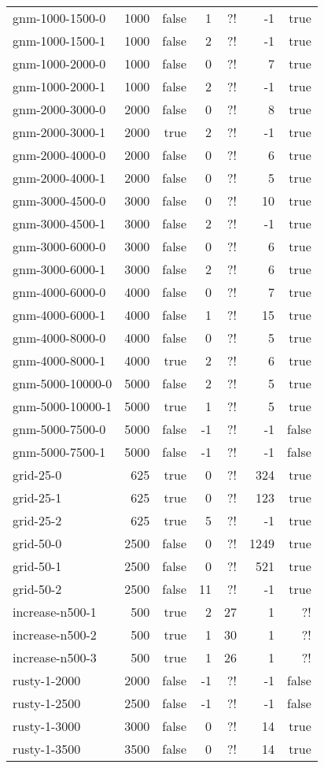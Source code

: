\documentclass{tufte-handout}
\begin{document}
\begin{longtable}{lrrrrrr}
gnm-1000-1500-0&1000&false&1&?!&-1&true\\ 
gnm-1000-1500-1&1000&false&2&?!&-1&true\\ 
gnm-1000-2000-0&1000&false&0&?!&7&true\\ 
gnm-1000-2000-1&1000&false&2&?!&-1&true\\ 
gnm-2000-3000-0&2000&false&0&?!&8&true\\ 
gnm-2000-3000-1&2000&true&2&?!&-1&true\\ 
gnm-2000-4000-0&2000&false&0&?!&6&true\\ 
gnm-2000-4000-1&2000&false&0&?!&5&true\\ 
gnm-3000-4500-0&3000&false&0&?!&10&true\\ 
gnm-3000-4500-1&3000&false&2&?!&-1&true\\ 
gnm-3000-6000-0&3000&false&0&?!&6&true\\ 
gnm-3000-6000-1&3000&false&2&?!&6&true\\ 
gnm-4000-6000-0&4000&false&0&?!&7&true\\ 
gnm-4000-6000-1&4000&false&1&?!&15&true\\ 
gnm-4000-8000-0&4000&false&0&?!&5&true\\ 
gnm-4000-8000-1&4000&true&2&?!&6&true\\ 
gnm-5000-10000-0&5000&false&2&?!&5&true\\ 
gnm-5000-10000-1&5000&true&1&?!&5&true\\ 
gnm-5000-7500-0&5000&false&-1&?!&-1&false\\ 
gnm-5000-7500-1&5000&false&-1&?!&-1&false\\ 
grid-25-0&625&true&0&?!&324&true\\ 
grid-25-1&625&true&0&?!&123&true\\ 
grid-25-2&625&true&5&?!&-1&true\\ 
grid-50-0&2500&false&0&?!&1249&true\\ 
grid-50-1&2500&false&0&?!&521&true\\ 
grid-50-2&2500&false&11&?!&-1&true\\ 
increase-n500-1&500&true&2&27&1&?!\\ 
increase-n500-2&500&true&1&30&1&?!\\ 
increase-n500-3&500&true&1&26&1&?!\\ 
rusty-1-2000&2000&false&-1&?!&-1&false\\ 
rusty-1-2500&2500&false&-1&?!&-1&false\\ 
rusty-1-3000&3000&false&0&?!&14&true\\ 
rusty-1-3500&3500&false&0&?!&14&true\\ 

\end{longtable}
\end{document}
